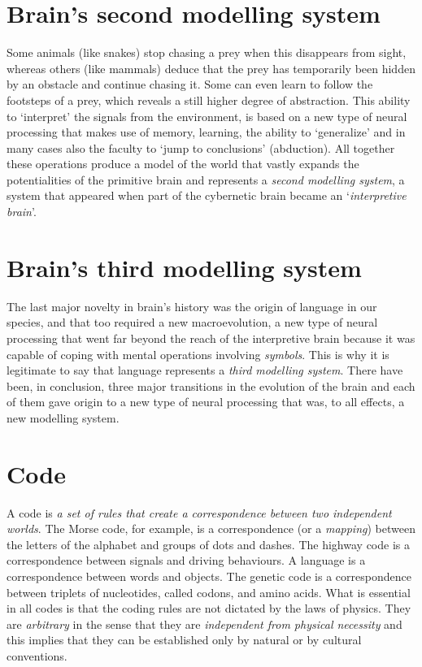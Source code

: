 \documentclass[12pt]{article}
\begin{document}
\section{Brain's second modelling system}
Some animals (like snakes) stop chasing a prey when this disappears from sight, whereas others (like mammals) deduce that the prey has temporarily been hidden by an obstacle and continue chasing it. Some can even learn to follow the footsteps of a prey, which reveals a still higher degree of abstraction. This ability to `interpret' the signals from the environment, is based on a new type of neural processing that makes use of memory, learning, the ability to `generalize' and in many cases also the faculty to `jump to conclusions' (abduction). All together these operations produce a model of the world that vastly expands the potentialities of the primitive brain and represents a \textit{second modelling system}, a system that appeared when part of the cybernetic brain became an `\textit{interpretive brain}'. 


\section{Brain's third modelling system}
The last major novelty in brain's history was the origin of language in our species, and that too required a new macroevolution, a new type of neural processing that went far beyond the reach of the interpretive brain because it was capable of coping with mental operations involving \textit{symbols}. This is why it is legitimate to say that language represents a \textit{third modelling system}. There have been, in conclusion, three major transitions in the evolution of the brain and each of them gave origin to a new type of neural processing that was, to all effects, a new modelling system. 

 
\section{Code}
A code is \textit{a set of rules that create a correspondence between two independent worlds}. The Morse code, for example, is a correspondence (or a \textit{mapping}) between the letters of the alphabet and groups of dots and dashes. The highway code is a correspondence between signals and driving behaviours. A language is a correspondence between words and objects. The genetic code is a correspondence between triplets of nucleotides, called codons, and amino acids. What is essential in all codes is that the coding rules are not dictated by the laws of physics. They are \textit{arbitrary} in the sense that they are \textit{independent from physical necessity} and this implies that they can be established only by natural or by cultural conventions. 
\end{document}
